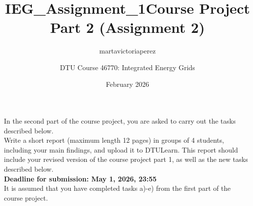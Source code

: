 \documentclass[10pt]{article}
\title{IEG_Assignment_1}
\author{martavictoriaperez }
\date{February 2026}
\begin{document}
 
\title{\textbf{Course Project Part 2 (Assignment 2)}}
\author{DTU Course 46770: Integrated Energy Grids}
\maketitle

In the second part of the course project, you are asked to carry out the tasks described below. \\

Write a short report (maximum length 12 pages) in groups of 4 students, including your main findings, and upload it to DTULearn. This report should include your revised version of the course project part 1, as well as the new tasks described below. \\

\textbf{Deadline for submission: May 1, 2026, 23:55} \\

It is assumed that you have completed tasks a)-e) from the first part of the course project. 
\end{document}
